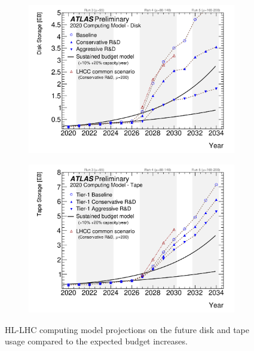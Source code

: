\begin{figure}[h]
    \centering
    \vspace{20px}
    \begin{subfigure}{.5\textwidth}
        \centering
        \includegraphics[width=\textwidth]{content/img/computing model-disk.png}
        \label{fig:intro_computing_disk}
      \end{subfigure}%
      \begin{subfigure}{.5\textwidth}
        \centering
        \includegraphics[width=\textwidth]{content/img/computing model-tape.png}
        \label{fig:intro_computing_tape}
    \end{subfigure}%
    \caption{HL-LHC computing model projections on the future disk and tape usage compared to the expected budget increases.\cite{CERN-LHCC-2020-015}}
    \vspace{20px}
    \label{fig:intro_computing_models}
\end{figure}

